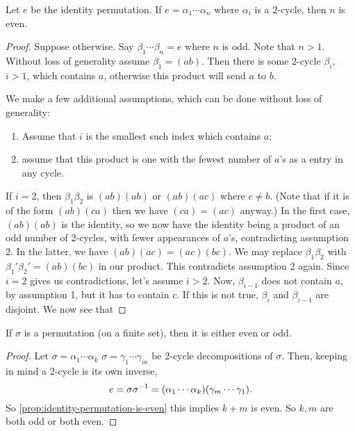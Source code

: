 \documentclass[./main.tex]{subfiles}
\begin{document}
\begin{proposition}
\label{prop:identity-permutation-is-even}
    Let $e$ be the identity permutation. If $e = \alpha_1 \cdots \alpha_n$ where
    $\alpha_i$ is a 2-cycle, then $n$ is even.
\end{proposition}
\begin{proof}
    Suppose otherwise. Say $\beta_1 \cdots \beta_n = e$ where $n$ is odd. Note
    that $n > 1$. Without loss of generality assume $\beta_1 = (ab)$. Then there
    is some 2-cycle $\beta_i$, $i > 1$, which contains $a$, otherwise this
    product will send $a$ to $b$.

    We make a few additional assumptions, which can be done without loss of generality:
    \begin{enumerate}
        \item Assume that $i$ is
        the smallest such index which contains $a$;
        \item assume that this product is
        one with the fewest number of $a$'s as a entry in any cycle.
    \end{enumerate}
    
    If $i = 2$, then $\beta_1 \beta_2$ is $(ab)(ab)$ or $(ab)(ac)$ where $c \neq
    b$. (Note that if it is of the form $(ab)(ca)$ then we have $(ca) = (ac)$
    anyway.) In the first case, $(ab)(ab)$ is the identity, so we now have the
    identity being a product of an odd number of 2-cycles, with fewer
    appearances of $a$'s, contradicting assumption 2. In the latter, we have
    $(ab)(ac) = (ac)(bc)$. We may replace $\beta_1 \beta_2$ with $\beta_1'
    \beta_2' = (ab)(bc)$ in our product. This contradicts assumption 2 again.
    Since $i = 2$ gives us contradictions, let's assume $i > 2$. Now,
    $\beta_{i-1}$ does not contain $a$, by assumption 1, but it has to contain
    $c$. If this is not true, $\beta_i$ and $\beta_{i-1}$ are disjoint. We now
    see that 
\end{proof}

\begin{theorem}
    If $\sigma$ is a permutation (on a finite set), then it is either even or odd.
\end{theorem}
\begin{proof}
    Let $\sigma = \alpha_1 \cdots \alpha_k$ $\sigma = \gamma_1 \cdots \gamma_m$
    be 2-cycle decompositions of $\sigma$. Then, keeping in mind a 2-cycle is
    its own inverse,
    \[
        e = \sigma \sigma\inv = \paren{\alpha_1 \cdots \alpha_k} \paren{\gamma_m \cdots \gamma_1}.
    \]
    So \cref{prop:identity-permutation-is-even} this implies $k+m$ is even. So
    $k,m$ are both odd or both even.
\end{proof}
\end{document}
